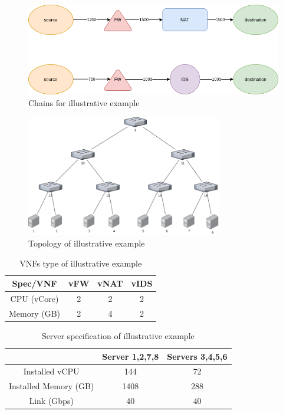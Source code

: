 \begin{figure}
    \centering
    \includegraphics[width=0.7\linewidth]{images/example-chains.png}
    \caption{Chains for illustrative example}
    \label{fig:example-chains}
\end{figure}

\begin{figure}
    \centering
    \includegraphics[height=150pt]{images/example-toplogy.png}
    \caption{Topology of illustrative example}
    \label{fig:example-topology}
\end{figure}

\begin{table}
    \centering
    \caption{VNFs type of illustrative example}
    \begin{tabular}{|c|c|c|c|}
        \hline
        Spec/VNF & vFW & vNAT & vIDS \\
        \hline
        CPU (vCore) & 2 & 2 & 2 \\
        \hline
        Memory (GB) & 2 & 4 & 2 \\
        \hline
    \end{tabular}
    \label{tbl:example-vnf-types}
\end{table}

\begin{table}
    \centering
    \caption{Server specification of illustrative example}
    \begin{tabular}{|c|c|c|}
        \hline
        & Server 1,2,7,8 & Servers 3,4,5,6 \\
        \hline
        Installed vCPU & 144 & 72 \\
        \hline
        Installed Memory (GB) & 1408 & 288 \\
        \hline
        Link (Gbps) & 40 & 40 \\
        \hline
    \end{tabular}
    \label{tbl:example-server-spec}
\end{table}

